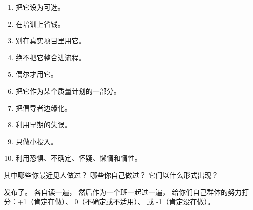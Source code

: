 \begin{enumerate}

\item
  把它设为可选。

\item
  在培训上省钱。

\item
  别在真实项目里用它。

\item
  绝不把它整合进流程。

\item
  偶尔才用它。

\item
  把它作为某个质量计划的一部分。

\item
  把倡导者边缘化。

\item
  利用早期的失误。

\item
  只做小投入。

\item
  利用恐惧、不确定、怀疑、懒惰和惰性。

\end{enumerate}

其中哪些你最近见人做过？
哪些你自己做过？
它们以什么形式出现？


发布了。
各自读一遍，
然后作为一个班一起过一遍，
给你们自己群体的努力打分：+1（肯定在做）、
0（不确定或不适用）、
或 -1（肯定没在做）。
